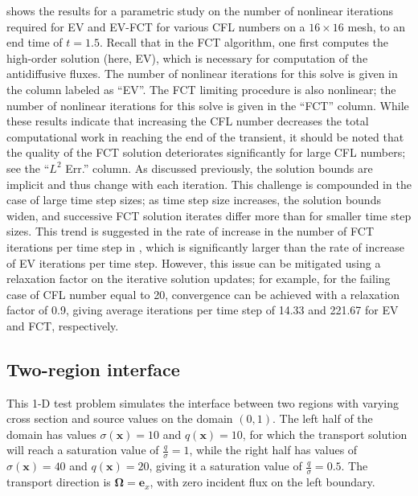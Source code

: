 \documentclass[xchauthor,chkrefs,fixeqskip,GCNS,amsmath,amsthm]{yjcphg}
\theoremstyle{remark}
\newcommand{\di}{\bm{\Omega}}
\begin{document}
 shows the results for a
parametric study on the number of nonlinear iterations required for EV
and EV-FCT for various CFL numbers on a $16\times16$ mesh, to an end
time of $t=1.5$. Recall that in the FCT algorithm, one first computes
the high-order solution (here, EV), which is necessary for computation
of the antidiffusive fluxes. The number of nonlinear iterations for this
solve is given in the column labeled as ``EV''. The FCT limiting
procedure is also nonlinear; the number of nonlinear iterations for this
solve is given in the ``FCT'' column. While these results indicate that
increasing the CFL number decreases the total computational work in
reaching the end of the transient, it should be noted that the quality
of the FCT solution deteriorates significantly for large CFL numbers;
see the ``$L^{2}$ Err.'' column. As discussed previously, the solution
bounds are implicit and thus change with each iteration. This challenge
is compounded in the case of large time step sizes; as time step size
increases, the solution bounds widen, and successive FCT solution
iterates differ more than for smaller time step sizes. This trend is
suggested in the rate of increase in the number of FCT iterations per
time step in , which is
significantly larger than the rate of increase of EV iterations per time
step. However, this issue can be mitigated using a relaxation factor on
the iterative solution updates; for example, for the failing case of CFL
number equal to 20, convergence can be achieved with a relaxation factor
of 0.9, giving average iterations per time step of 14.33 and 221.67 for
EV and FCT, respectively.


\subsection{Two-region interface}

This 1-D test problem simulates the interface between two regions with
varying cross section and source values on the domain $(0,1)$. The left
half of the domain has values $\sigma(\mathbf{x})=10$ and $q(
\mathbf{x})=10$, for which the transport solution will reach a
saturation value of $\frac{q}{\sigma}=1$, while the right half has
values of $\sigma(\mathbf{x})=40$ and $q(\mathbf{x})=20$, giving it a
saturation value of $\frac{q}{\sigma}=0.5$. The transport direction is
$\di=\mathbf{e}_{x}$, with zero incident flux on the left boundary.
\end{document}
